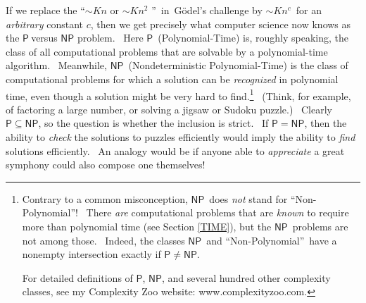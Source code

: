 \documentclass[11pt,onecolumn]{article}%
\begin{document}
If we replace the \textquotedblleft$\sim Kn$ or $\sim Kn^{2}$%
\textquotedblright\ in\ G\"{o}del's challenge by $\sim Kn^{c}$\ for an
\textit{arbitrary} constant $c$, then we get precisely what computer science
now knows as the $\mathsf{P}\ $versus $\mathsf{NP}$ problem. \ Here
$\mathsf{P}$\ (Polynomial-Time) is, roughly speaking, the class of all
computational problems that are solvable by a polynomial-time algorithm.
\ Meanwhile, $\mathsf{NP}$\ (Nondeterministic Polynomial-Time) is the class of
computational problems for which a solution can be \textit{recognized} in
polynomial time, even though a solution might be very hard to
find.\footnote{Contrary to a common misconception, $\mathsf{NP}$\ does
\textit{not} stand for \textquotedblleft Non-Polynomial\textquotedblright!
\ There \textit{are} computational problems that are \textit{known} to require
more than polynomial time (see Section \ref{TIME}), but the $\mathsf{NP}%
$\ problems are not among those. \ Indeed, the classes $\mathsf{NP}$\ and
\textquotedblleft Non-Polynomial\textquotedblright\ have a nonempty
intersection exactly if $\mathsf{P}\neq\mathsf{NP}$.
\par
For detailed definitions of $\mathsf{P}$, $\mathsf{NP}$, and several hundred
other complexity classes, see my Complexity Zoo website:
www.complexityzoo.com.} \ (Think, for example, of factoring a large number, or
solving a jigsaw or Sudoku puzzle.) \ Clearly $\mathsf{P}\subseteq\mathsf{NP}%
$, so the question is whether the inclusion is strict. \ If $\mathsf{P}%
=\mathsf{NP}$, then the ability to \textit{check} the solutions to puzzles
efficiently would imply the ability to \textit{find} solutions efficiently.
\ An analogy would be if anyone able to \textit{appreciate} a great symphony
could also compose one themselves!
\end{document}

